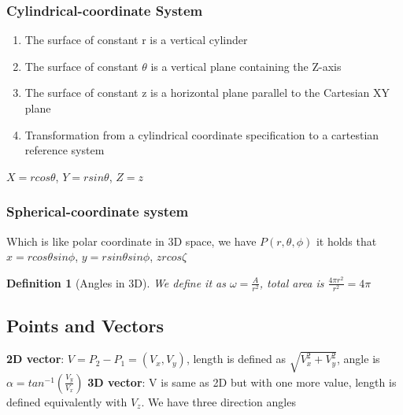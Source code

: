 \documentclass[11pt]{article}
\newtheorem{definition}[theorem]{Definition}
\begin{document}
\subsubsection{Cylindrical-coordinate System}
\begin{enumerate}
    \item The surface of constant r is a vertical cylinder
    \item The surface of constant $\theta$ is a vertical plane containing the Z-axis
    \item The surface of constant z is a horizontal plane parallel to the Cartesian XY plane
    \item Transformation from a cylindrical coordinate specification to a cartestian reference system 
\end{enumerate}

$X = r cos \theta $, $Y = r sin \theta$, $ Z = z$

\subsubsection{Spherical-coordinate system}
Which is like polar coordinate in 3D space, we have $P(r,\theta,\phi)$
\newline
it holds that $x = r cos \theta sin \phi$, $y= r sin \theta sin \phi$, $z r cos \zeta$    

\begin{definition}[Angles in 3D] We define it as $ \omega = \frac{A}{r^2}$, total area is $\frac{4\pi r^2}{r^2} = 4\pi$ 

    
\end{definition}

\subsection{Points and Vectors}
\textbf{2D vector}:  $V = P_2 - P_1 = (V_x, V_y)$, length is defined as $\sqrt{V_x^2 + V_y^2}$, angle is $\alpha = tan^{-1}(\frac{V_y}{V_x})$ 
\newline
\textbf{3D vector}: V is same as 2D but with one more value, length is defined equivalently with $V_z$. We have three direction angles %
\end{document}
